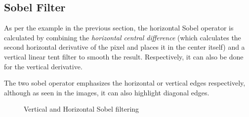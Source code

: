 \documentclass[twoside,a4paper,article]{combine}
\begin{document}
\subsection{Sobel Filter}
As per the example in the previous section, the horizontal Sobel operator is calculated by combining the \emph{horizontal central difference}
(which calculates the second horizontal derivative of the pixel and places it in the center itself) and a vertical linear tent filter to smooth the result. Respectively, it can also
be done for the vertical derivative.

The two sobel operator emphasizes the horizontal or vertical edges respectively, although as seen in the images, it can also highlight diagonal edges.\\
\begin{minipage}{\textwidth}\begin{figure}[H]
    \centering
    \caption{Vertical and Horizontal Sobel filtering\cite{NASA_on_The_Commons_2023}}\label{fig:sobel}
\end{figure}\end{minipage}
\end{document}
